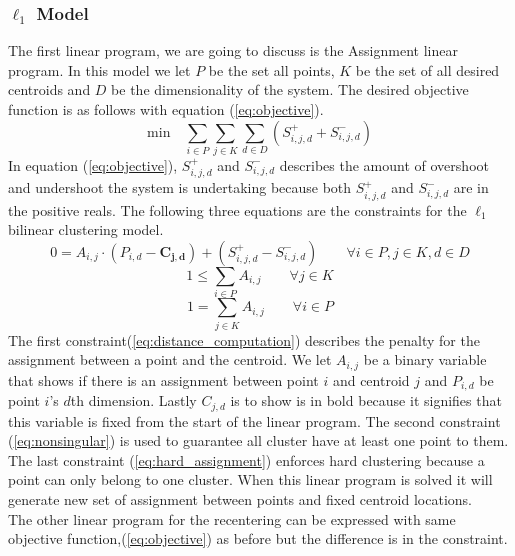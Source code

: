 \documentclass[a4paper,12pt]{article}
\numberwithin{equation}{section}
\begin{document}
\subsubsection{$\ell_1$ Model}
The first linear program, we are going to discuss is the Assignment linear program. In this model we let $P$ be the set all points, $K$ be the set of all desired centroids and $D$ be the dimensionality of the system. The desired objective function is as follows with equation (\ref{eq:objective}).
 \begin{equation}
 \text{min} \quad \sum_{i \in P}\sum_{j \in K}\sum_{d \in D} (S^{+}_{i,j,d}+S^{-}_{i,j,d}) 
 \label{eq:objective}
\end{equation}
In equation (\ref{eq:objective}), $S^{+}_{i,j,d}$ and $S^{-}_{i,j,d}$ describes the amount of overshoot and undershoot the system is undertaking because both $S^{+}_{i,j,d}$ and $S^{-}_{i,j,d}$ are in the positive reals. The following three equations are the constraints for the $\ell_1$ bilinear clustering model. 
\begin{equation}
0=A_{i,j}\cdot(P_{i,d}-\boldsymbol{C_{j,d}})+(S^{+}_{i,j,d}-S^{-}_{i,j,d}) \qquad \forall i \in P, j\in K, d \in D
\label{eq:distance_computation}
\end{equation}
\begin{equation}
1\leq \sum_{i \in P} A_{i,j} \qquad \forall j \in K
\label{eq:nonsingular}
\end{equation}
\begin{equation}
1 = \sum_{j \in K} A_{i,j}  \qquad \forall i \in P
\label{eq:hard_assignment}
\end{equation}
The first constraint(\ref{eq:distance_computation}) describes the penalty for the assignment between a point and the centroid. We let $A_{i,j}$ be a binary variable that shows if there is an assignment between point $i$ and centroid $j$ and $P_{i,d}$ be point $i$'s  $d$th dimension. Lastly $C_{j,d}$ is to show is in bold because it signifies that this variable is fixed from the start of the linear program. The second constraint (\ref{eq:nonsingular}) is used to guarantee all cluster have at least one point to them. The last constraint (\ref{eq:hard_assignment}) enforces hard clustering because a point can only belong to one cluster. When this linear program is solved it will generate new set of assignment between points and fixed centroid locations. \\

The other linear program for the recentering can be expressed with same objective function,(\ref{eq:objective}) as before but the difference is in the constraint. 
\end{document}
